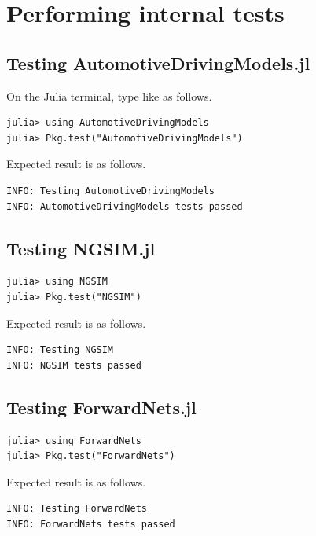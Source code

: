 \documentclass[openany,11pt]{report}%
\begin{document}
\chapter{Performing internal tests}

\section{Testing AutomotiveDrivingModels.jl}

On the Julia terminal, type like as follows.

\begin{lstlisting}[style=DOS]
julia> using AutomotiveDrivingModels
julia> Pkg.test("AutomotiveDrivingModels")
\end{lstlisting}

Expected result is as follows.

\begin{lstlisting}[style=DOS]
INFO: Testing AutomotiveDrivingModels
INFO: AutomotiveDrivingModels tests passed
\end{lstlisting}

\section{Testing NGSIM.jl}

\begin{lstlisting}[style=DOS]
julia> using NGSIM
julia> Pkg.test("NGSIM")
\end{lstlisting}

Expected result is as follows.

\begin{lstlisting}[style=DOS]
INFO: Testing NGSIM
INFO: NGSIM tests passed
\end{lstlisting}

\section{Testing ForwardNets.jl}

\begin{lstlisting}[style=DOS]
julia> using ForwardNets
julia> Pkg.test("ForwardNets")
\end{lstlisting}

Expected result is as follows.

\begin{lstlisting}[style=DOS]
INFO: Testing ForwardNets
INFO: ForwardNets tests passed
\end{lstlisting}
\end{document}
